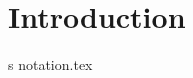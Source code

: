\documentclass[../open-optimization/open-optimization.tex]{subfiles}
\begin{document}

\chapter*{Introduction}s
{notation.tex}


\end{document}
